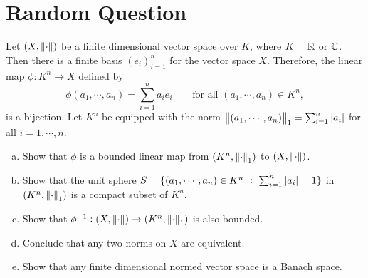 \chapter{Random Question}

\begin{problem}
	Let $ (X,\norm{\cdot}) $ be a finite dimensional vector space over $ K $, where $ K = \mathbb{R} $ or $ \mathbb{C} $. Then there is a finite basis $ (e_i)_{i=1}^n $ for the vector space $ X $. Therefore, the linear map $ \phi: K^n \to X $ defined by
	\[ \phi(a_1,\cdots,a_n) = \sum_{i=1}^{n} a_i e_i  \qquad \text{for all } (a_1,\cdots,a_n) \in K^n, \]
	is a bijection. Let $ K^n $  be equipped with the norm $ \norm{(a_1,\cdots,a_n)}_{1} = \sum_{i=1}^{n}|a_i| $ for all $ i = 1,\cdots,n $.
	\begin{enumerate}[(a)]
		\item Show that $ \phi $ is a bounded linear map from $ (K^n,\norm{\cdot}_1) $ to $ (X,\norm{\cdot}) $.
		\item Show that the unit sphere $ S = \{(a_1,\cdots,a_n)\in K^n\ :\ \sum_{i=1}^{n}|a_i| = 1\} $ in $ (K^n,\norm{\cdot}_1) $ is a compact subset of $ K^n $.
		
		\item Show that $ \phi^{-1}: (X,\norm{\cdot})\to (K^n,\norm{\cdot}_1) $ is also bounded.
		
		\item Conclude that any two norms on $ X $ are equivalent.
		
		\item Show that any finite dimensional normed vector space is a Banach space. 
	\end{enumerate}
\end{problem}

